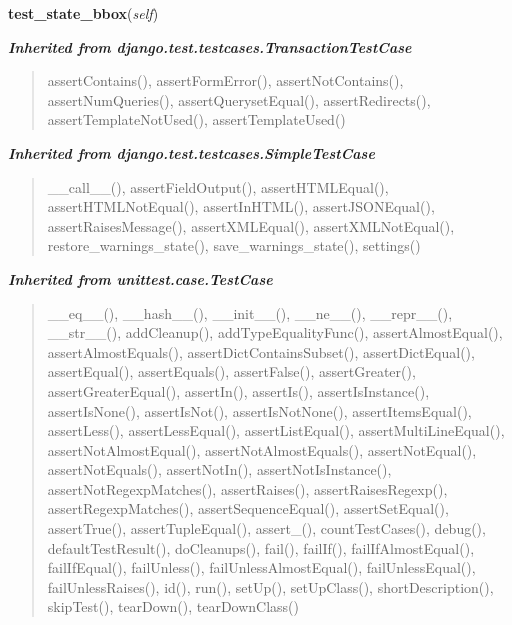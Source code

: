     \label{spatio_main:tests:ModelTests:test_state_bbox}

    \vspace{0.5ex}

\hspace{.8\funcindent}\begin{boxedminipage}{\funcwidth}

    \raggedright \textbf{test\_state\_bbox}(\textit{self})

\setlength{\parskip}{2ex}
\setlength{\parskip}{1ex}
    \end{boxedminipage}


\large{\textbf{\textit{Inherited from django.test.testcases.TransactionTestCase}}}

\begin{quote}
assertContains(), assertFormError(), assertNotContains(), assertNumQueries(), assertQuerysetEqual(), assertRedirects(), assertTemplateNotUsed(), assertTemplateUsed()
\end{quote}

\large{\textbf{\textit{Inherited from django.test.testcases.SimpleTestCase}}}

\begin{quote}
\_\_call\_\_(), assertFieldOutput(), assertHTMLEqual(), assertHTMLNotEqual(), assertInHTML(), assertJSONEqual(), assertRaisesMessage(), assertXMLEqual(), assertXMLNotEqual(), restore\_warnings\_state(), save\_warnings\_state(), settings()
\end{quote}

\large{\textbf{\textit{Inherited from unittest.case.TestCase}}}

\begin{quote}
\_\_eq\_\_(), \_\_hash\_\_(), \_\_init\_\_(), \_\_ne\_\_(), \_\_repr\_\_(), \_\_str\_\_(), addCleanup(), addTypeEqualityFunc(), assertAlmostEqual(), assertAlmostEquals(), assertDictContainsSubset(), assertDictEqual(), assertEqual(), assertEquals(), assertFalse(), assertGreater(), assertGreaterEqual(), assertIn(), assertIs(), assertIsInstance(), assertIsNone(), assertIsNot(), assertIsNotNone(), assertItemsEqual(), assertLess(), assertLessEqual(), assertListEqual(), assertMultiLineEqual(), assertNotAlmostEqual(), assertNotAlmostEquals(), assertNotEqual(), assertNotEquals(), assertNotIn(), assertNotIsInstance(), assertNotRegexpMatches(), assertRaises(), assertRaisesRegexp(), assertRegexpMatches(), assertSequenceEqual(), assertSetEqual(), assertTrue(), assertTupleEqual(), assert\_(), countTestCases(), debug(), defaultTestResult(), doCleanups(), fail(), failIf(), failIfAlmostEqual(), failIfEqual(), failUnless(), failUnlessAlmostEqual(), failUnlessEqual(), failUnlessRaises(), id(), run(), setUp(), setUpClass(), shortDescription(), skipTest(), tearDown(), tearDownClass()
\end{quote}

